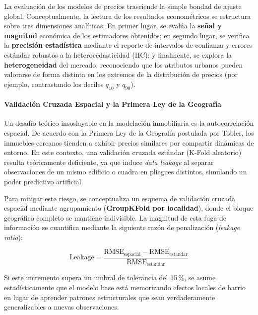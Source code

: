 \documentclass[12pt, a4paper, twoside, openright]{report}
\theoremstyle{plain}
\theoremstyle{definition}
\begin{document}
La evaluación de los modelos de precios trasciende la simple bondad de ajuste global. Conceptualmente, la lectura de los resultados econométricos se estructura sobre tres dimensiones analíticas: En primer lugar, se evalúa la \textbf{señal y magnitud} económica de los estimadores obtenidos; en segundo lugar, se verifica la \textbf{precisión estadística} mediante el reporte de intervalos de confianza y errores estándar robustos a la heterocedasticidad (HC); y finalmente, se explora la \textbf{heterogeneidad} del mercado, reconociendo que los atributos urbanos pueden valorarse de forma distinta en los extremos de la distribución de precios (por ejemplo, contrastando los deciles $q_{10}$ y $q_{90}$).

\paragraph{Validación Cruzada Espacial y la Primera Ley de la Geografía}

Un desafío teórico insoslayable en la modelación inmobiliaria es la autocorrelación espacial. De acuerdo con la Primera Ley de la Geografía postulada por Tobler, los inmuebles cercanos tienden a exhibir precios similares por compartir dinámicas de entorno. En este contexto, una validación cruzada estándar (K-Fold aleatorio) resulta teóricamente deficiente, ya que induce \emph{data leakage} al separar observaciones de un mismo edificio o cuadra en pliegues distintos, simulando un poder predictivo artificial.

Para mitigar este riesgo, se conceptualiza un esquema de validación cruzada espacial mediante agrupamiento (\textbf{GroupKFold por localidad}), donde el bloque geográfico completo se mantiene indivisible. La magnitud de esta fuga de información se cuantifica mediante la siguiente razón de penalización (\textit{leakage ratio}):

\begin{equation}
\text{Leakage} = \frac{\text{RMSE}_{\text{espacial}} - \text{RMSE}_{\text{estandar}}}{\text{RMSE}_{\text{estandar}}}
\end{equation}

Si este incremento supera un umbral de tolerancia del 15\,\%, se asume estadísticamente que el modelo base está memorizando efectos locales de barrio en lugar de aprender patrones estructurales que sean verdaderamente generalizables a nuevas observaciones.
\end{document}

